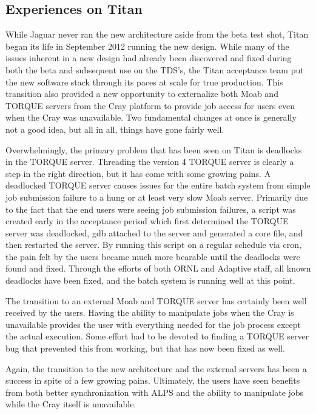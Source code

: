 \subsection{Experiences on Titan}

While Jaguar never ran the new architecture aside from the beta test shot,
Titan began its life in September 2012 running the new design.  While many of
the issues inherent in a new design had already been discovered and fixed
during both the beta and subsequent use on the TDS’s, the Titan acceptance team
put the new software stack through its paces at scale for true production.
This transition also provided a new opportunity to externalize both Moab and
TORQUE servers from the Cray platform to provide job access for users even when
the Cray was unavailable.  Two fundamental changes at once is generally not a
good idea, but all in all, things have gone fairly well.

Overwhelmingly, the primary problem that has been seen on Titan is deadlocks in
the TORQUE server.  Threading the version 4 TORQUE server is clearly a step in
the right direction, but it has come with some growing pains.  A deadlocked
TORQUE server causes issues for the entire batch system from simple job
submission failure to a hung or at least very slow Moab server.  Primarily due
to the fact that the end users were seeing job submission failures, a script
was created early in the acceptance period which first determined the TORQUE
server was deadlocked, gdb attached to the server and generated a core file,
and then restarted the server.  By running this script on a regular schedule
via cron, the pain felt by the users became much more bearable until the
deadlocks were found and fixed.  Through the efforts of both ORNL and Adaptive
staff, all known deadlocks have been fixed, and the batch system is running
well at this point. 

The transition to an external Moab and TORQUE server has certainly been well
received by the users.  Having the ability to manipulate jobs when the Cray is
unavailable provides the user with everything needed for the job process except
the actual execution.  Some effort had to be devoted to finding a TORQUE server
bug that prevented this from working, but that has now been fixed as well.

Again, the transition to the new architecture and the external servers has been
a success in spite of a few growing pains.  Ultimately, the users have seen
benefits from both better synchronization with ALPS and the ability to
manipulate jobs while the Cray itself is unavailable.

